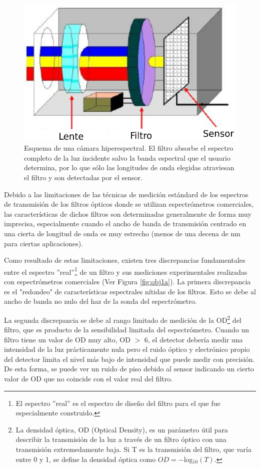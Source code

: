 \documentclass{ctuthesis}
\begin{document}
\begin{figure}[H]
	\centering
	\includegraphics[scale=0.8]{Figs/plan_de_tesis/cam_sens.png}
	\caption{ Esquema de una cámara hiperespectral. El filtro absorbe el 
	espectro completo de la luz incidente salvo la banda espectral que el 
	usuario determina, por lo que sólo las longitudes de onda elegidas 
	atraviesan el filtro y son detectadas por el sensor. \cite{Martínez2016}}
	\label{fig:camsens}
\end{figure}



Debido a las limitaciones de las técnicas de 
medición estándard 
de los espectros de transmisión de los filtros ópticos donde se utilizan 
espectrómetros comerciales, las características de dichos 
filtros son determinadas generalmente de forma muy imprecisa, especialmente 
cuando el ancho de banda de transmisión centrado en una cierta de longitud de 
onda es muy estrecho (menos de una decena de nm para ciertas aplicaciones).


Como resultado de estas limitaciones, existen tres discrepancias fundamentales 
entre el espectro ''real''\footnote{El espectro ''real'' es 
	el espectro de diseño del filtro para el que fue especialmente construido.} 
	de 
un 
filtro y sus mediciones experimentales realizadas con 
espectrómetros comerciales (Ver Figura \ref{fig:obj1a})\cite{Semrock}. La 
primera discrepancia es el "redondeo" de características espectrales nítidas de 
los filtros. 
Esto se debe al ancho de banda no nulo del haz de la sonda del 
espectrómetro. 


La segunda discrepancia se debe al rango limitado de 
medición de la OD\footnote{La densidad óptica, OD (Optical Density), es un 
	parámetro útil para describir la transmisión de la luz a través de un 
	filtro 
	óptico con una transmisión extremedamente baja. Si T es la transmisión del 
	filtro, que varía entre 0 y 1, se define la densidad óptica como $OD = 
	-$log$_{10} (T)$.} del filtro, que es 
producto de la sensibilidad limitada del espectrómetro. Cuando un filtro 
tiene un valor de OD muy alto, OD $>$ 6, el detector debería medir una 
intensidad de la luz prácticamente nula pero el ruido óptico y electrónico 
propio del detector limita el nivel más bajo de intensidad que puede medir 
con precisión. De esta forma, se puede ver un ruido de piso debido al 
sensor indicando un cierto valor de OD que no coincide con el valor real 
del filtro.
\end{document}
